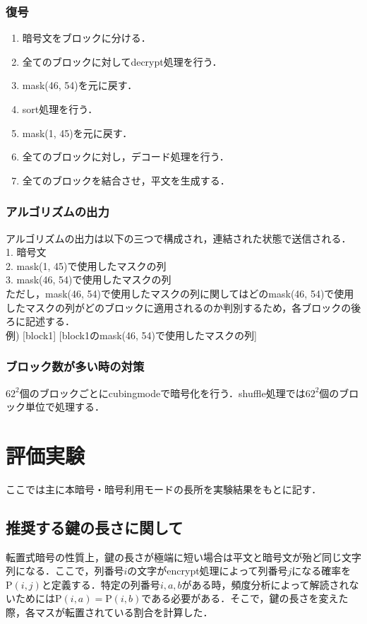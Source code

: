 \documentclass[a4p]{jarticle}
\begin{document}
\subsubsection{復号}
\begin{enumerate}
\item 暗号文をブロックに分ける．
\item 全てのブロックに対してdecrypt処理を行う．
\item mask(46, 54)を元に戻す．
\item sort処理を行う．
\item mask(1, 45)を元に戻す．
\item 全てのブロックに対し，デコード処理を行う．
\item 全てのブロックを結合させ，平文を生成する．
\end{enumerate}

\subsubsection{アルゴリズムの出力}
アルゴリズムの出力は以下の三つで構成され，連結された状態で送信される．\\
1. 暗号文\\
2. mask(1, 45)で使用したマスクの列\\
3. mask(46, 54)で使用したマスクの列\\
ただし，mask(46, 54)で使用したマスクの列に関してはどのmask(46, 54)で使用したマスクの列がどのブロックに適用されるのか判別するため，各ブロックの後ろに記述する．\\
例) [block1] [block1のmask(46, 54)で使用したマスクの列] 

\subsubsection{ブロック数が多い時の対策}
\(62^2\)個のブロックごとにcubingmodeで暗号化を行う．shuffle処理では\(62^2\)個のブロック単位で処理する．

\section{評価実験}
ここでは主に本暗号・暗号利用モードの長所を実験結果をもとに記す．
\subsection{推奨する鍵の長さに関して}
転置式暗号の性質上，鍵の長さが極端に短い場合は平文と暗号文が殆ど同じ文字列になる．ここで，列番号\(i\)の文字がencrypt処理によって列番号\(j\)になる確率を\(\mathrm{P}(i,j)\)と定義する．特定の列番号\(i,a,b\)がある時，頻度分析によって解読されないためには\(\mathrm{P}(i,a)=\mathrm{P}(i,b)\)である必要がある．そこで，鍵の長さを変えた際，各マスが転置されている割合を計算した．\\
\end{document}
